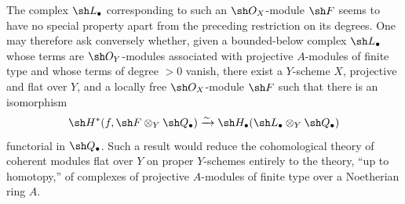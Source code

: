 The complex $\sh L_\bullet$ corresponding to such an
$\sh O_X$-module $\sh F$ seems to have no special property
apart from the preceding restriction on its degrees.  One may
therefore ask conversely whether, given a bounded-below complex
$\sh L_\bullet$ whose terms are $\sh O_Y$-modules associated
with projective $A$-modules of finite type and whose terms of
degree $>0$ vanish, there exist a $Y$-scheme $X$, projective and
flat over $Y$, and a locally free $\sh O_X$-module $\sh F$ such
that there is an isomorphism
\[
  \sh H^*
  (f,\sh F\otimes_Y\sh Q_\bullet)
  \xrightarrow{\sim}
  \sh H_\bullet
  (\sh L_\bullet\otimes_Y\sh Q_\bullet)
\]
functorial in $\sh Q_\bullet$.  Such a result would reduce the
cohomological theory of coherent modules flat over $Y$ on
proper $Y$-schemes entirely to the theory, ``up to homotopy,''
of complexes of projective $A$-modules of finite type over a
Noetherian ring $A$.
